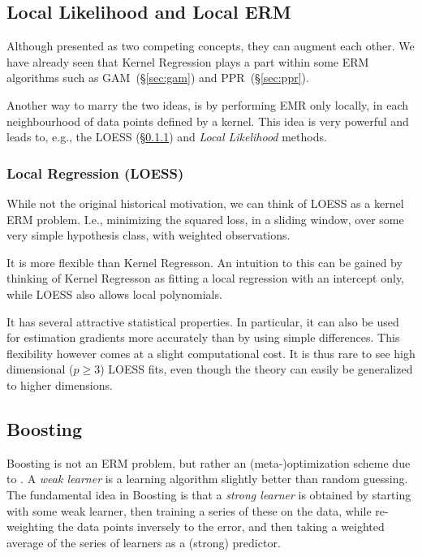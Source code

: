 \subsection{Local Likelihood and Local ERM}
Although presented as two competing concepts, they can augment each other. 
We have already seen that Kernel Regression plays a part within some ERM algorithms such as GAM~(\S\ref{sec:gam}) and PPR~(\S \ref{sec:ppr}).

Another way to marry the two ideas, is by performing EMR only locally, in each neighbourhood of data points defined by a kernel. This idea is very powerful and leads to, e.g., the LOESS (\S \ref{sec:loess}) and \emph{Local Likelihood} methods.



\subsubsection{Local Regression (LOESS)}
\label{sec:loess}

While not the original historical motivation, we can think of LOESS as a kernel ERM problem. 
I.e., minimizing the squared loss, in a sliding window, over some very simple hypothesis class, with weighted observations.

It is more flexible than Kernel Regresson.
An intuition to this can be gained by thinking of Kernel Regresson as fitting a local regression with an intercept only, while LOESS also allows local polynomials.

It has several attractive statistical properties. In particular, it can also be used for estimation gradients more accurately than by using simple differences. 
This flexibility however comes at a slight computational cost. 
It is thus rare to see high dimensional ($p \geq 3$) LOESS fits, even though the theory can easily be generalized to higher dimensions.




\subsection{Boosting}
\label{sec:boosting}

Boosting is not an ERM problem, but rather an (meta-)optimization scheme due to \cite{schapire_strength_1990}.
A \emph{weak learner} is a learning algorithm slightly better than random guessing. 
The fundamental idea in Boosting is that a \emph{strong learner} is obtained by starting with some weak learner, then training a series of these on the data, while re-weighting the data points inversely to the error, and then taking a weighted average of the series of learners as a (strong) predictor.

